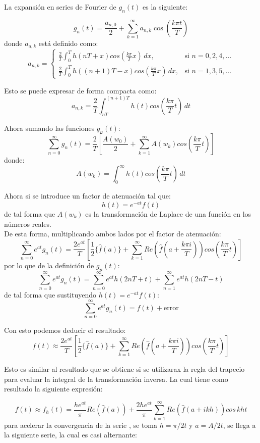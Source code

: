\documentclass[11pt]{article}
\numberwithin{equation}{section} %
\begin{document}
La expansión en series de Fourier de $g_n(t)$ es la siguiente:

\[
g_n(t)=\frac{a_{n,0}}{2}+\sum_{k=1}^{\infty}a_{n,k}\cos\left(\frac{k\pi t}{T}\right)
\]
donde $a_{a,k}$ está definido como:
\[
a_{n,k} =
\begin{cases}
\displaystyle \frac{2}{T}\int_0^T h(nT+x)cos\left(\frac{k\pi}{T}x\right)\,dx, & \mbox{si } n=0,2,4,\ldots \\
\displaystyle \frac{2}{T}\int_0^T h((n+1)T-x)cos\left(\frac{k\pi}{T}x\right)\,dx, & \mbox{si } n=1,3,5,\ldots
\end{cases}
\]

Esto se puede expresar de forma compacta como:
\[
a_{n,k}=\frac{2}{T}\int_{nT}^{(n+1)T} h(t)cos\left(\frac{k\pi}{T}t\right)\,dt
\]

Ahora sumando las funciones $g_n(t)$:
\[
\sum_{n=0}^{\infty}g_n(t)=\frac{2}{T}\left[\frac{A(w_0)}{2}+\sum_{k=1}^{\infty}A(w_k)cos\left(\frac{k\pi}{T}t\right)\right]
\]
donde:
\[
A(w_k)=\int_0^\infty h(t)cos\left(\frac{k\pi}{T}t\right)\,dt
\]

Ahora si se introduce un factor de atenuación tal que:
\[
h(t)=e^{-at}f(t)
\]
de tal forma que $A(w_k)$ es la transformación de Laplace de una función en los números reales.\\

De esta forma, multiplicando ambos lados por el factor de atenuación:
\[
\sum_{n=0}^{\infty}e^{at}g_n(t)=\frac{2e^{at}}{T}\left[\frac{1}{2} \{\hat{f}(a) \}+\sum_{k=1}^{\infty}Re\left(\hat{f}\left(a+\frac{k\pi i}{T}\right)\right)cos\left(\frac{k\pi}{T}t\right)\right]
\]
por lo que de la definición de $g_n(t)$:
\[
\sum_{n=0}^{\infty}e^{at}g_n(t)=\sum_{n=0}^{\infty}e^{at}h(2nT+t)+\sum_{n=1}^{\infty}e^{at}h(2nT-t)
\]
de tal forma que sustituyendo $h(t)=e^{-at}f(t)$:
\[
\sum_{n=0}^{\infty}e^{at}g_n(t) = f(t) + \text{error}
\]

Con esto podemos deducir el resultado:
\begin{equation}
f(t) \approx \frac{2e^{at}}{T}\left[\frac{1}{2} \{\hat{f}(a) \}+\sum_{k=1}^{\infty}Re\left(\hat{f}\left(a+\frac{k\pi i}{T}\right)\right)cos\left(\frac{k\pi}{T}t\right)\right]
\end{equation}

Esto es similar al resultado que se obtiene si se utilizarax la regla del trapecio para evaluar la integral de la transformación inversa. La cual tiene como resultado la siguiente expresión:

\[
f(t)\approx f_h(t)=\frac{he^{at}}{\pi} Re(\hat{f}(a))+\frac{2he^{at}}{\pi}\sum_{k=1}^{\infty}Re(\hat{f}(a+ikh))cos\,kht
\]
para acelerar la convergencia de la serie \cite{abate1995}, se toma $h=\pi/2t$ y $a=A/2t$, se llega a la siguiente serie, la cual es casi alternante:
\end{document}
